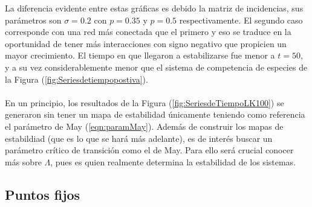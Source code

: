 La diferencia evidente entre estas gráficas es debido la matriz de incidencias, sus parámetros son $\sigma=0.2$ con $p=0.35$ y $p=0.5$ respectivamente. El segundo caso corresponde con una red más conectada que el primero y eso se traduce en la oportunidad de tener más interacciones con signo negativo que propicien un mayor crecimiento. El tiempo en que llegaron a estabilizarse fue menor a $t=50$, y a su vez considerablemente menor que el sistema de competencia de especies de la Figura (\ref{fig:Seriesdetiempopostiva}). 
\\
\\
En un principio, los resultados de la Figura (\ref{fig:SeriesdeTiempoLK100}) se generaron sin tener un mapa de estabilidad únicamente teniendo como referencia el parámetro de May (\ref{eqn:paramMay}). Además de construir los mapas de estabildiad (que es lo que se hará más adelante), es de interés buscar un parámetro crítico de transición como el de May. Para ello será crucial conocer más sobre $\Lambda$, pues es quien realmente determina la estabilidad de los sistemas.

\subsection{Puntos fijos}

